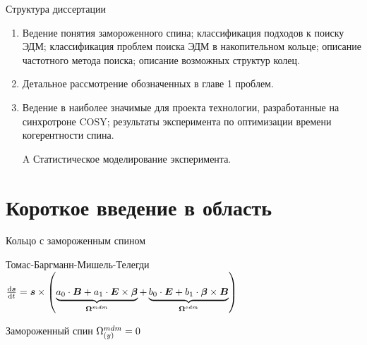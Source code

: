 \documentclass[14pt]{beamer}
\newcommand{\Wedm}{\W^{edm}}
\newcommand{\Wmdm}{\W^{mdm}}
\begin{document}
\begin{frame}{Структура диссертации}
	\begin{enumerate}
		\item Ведение понятия замороженного спина; классификация подходов к поиску ЭДМ; классификация проблем поиска ЭДМ в накопительном кольце; описание частотного метода поиска; описание возможных структур колец.
		\item Детальное рассмотрение обозначенных в главе 1 проблем.
		\item Ведение в наиболее значимые для проекта технологии, разработанные на синхротроне COSY; результаты эксперимента по оптимизации времени когерентности спина.
		\item[A] Статистическое моделирование эксперимента.
	\end{enumerate}
\end{frame}

\section{Короткое введение в область}

\begin{frame}{Кольцо с замороженным спином}
\begin{block}{Томас-Баргманн-Мишель-Телегди}
	$\frac{\rd \vec s}{\rd t} = \vec s \times \bkt{\underbrace{a_0\cdot\vec B + a_1\cdot\vec E\times\vec\beta}_{\vec\Wmdm} + \underbrace{b_0\cdot\vec E + b_1\cdot\vec\beta\times\vec B}_{\vec\Wedm}}$
\end{block}
\begin{block}{Замороженный спин}
	$\Wmdm_{(y)} = 0$
\end{block}
\end{frame}
\end{document}
